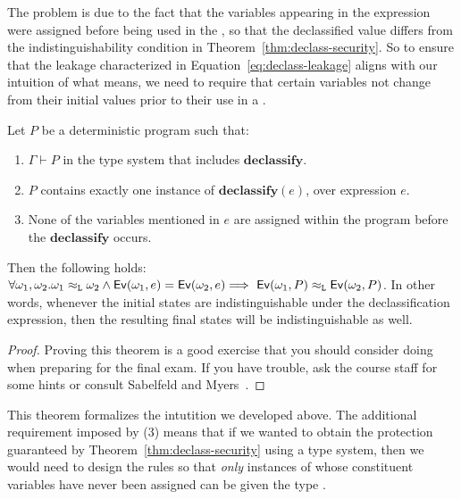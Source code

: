 \documentclass[11pt,twoside]{scrartcl}
\begin{document}
The problem is due to the fact that the \hisec variables appearing in the  expression were assigned before being used in the , so that the declassified value differs from the indistinguishability condition in Theorem~\ref{thm:declass-security}. So to ensure that the leakage characterized in Equation~\ref{eq:declass-leakage} aligns with our intuition of what  means, we need to require that certain variables not change from their initial values prior to their use in a . 

\begin{theorem}
\label{thm:declass-security}
Let $P$ be a deterministic program such that:
\begin{enumerate}
\item $\Gamma \vdash P$ in the type system that includes $\mathbf{declassify}$. 
\item $P$ contains exactly one instance of $\mathbf{declassify}(e)$, over expression $e$.
\item None of the variables mentioned in $e$ are assigned within the program before the $\mathbf{declassify}$ occurs.
\end{enumerate}
Then the following holds:
$
\forall \omega_1, \omega_2 . \omega_1 \approx_\lowsec \omega_2 \land \eval{\omega_1}{e} = \eval{\omega_2}{e} \Longrightarrow\ \eval{\omega_1}{P} \approx_\lowsec \eval{\omega_2}{P}
$.
In other words, whenever the initial states are indistinguishable under the declassification expression, then the resulting final states will be indistinguishable as well.
\end{theorem}

\begin{proof}
Proving this theorem is a good exercise that you should consider doing when preparing for the final exam. If you have trouble, ask the course staff for some hints or consult Sabelfeld and Myers~\cite{Sabelfeld04}.
\end{proof}

This theorem formalizes the intutition we developed above. The additional requirement imposed by (3) means that if we wanted to obtain the protection guaranteed by Theorem~\ref{thm:declass-security} using a type system, then we would need to design the rules so that \emph{only} instances of  whose constituent variables have never been assigned can be given the type \lowsec.


\end{document}
